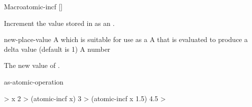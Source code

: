 \begin{functiondoc}{Macro}{atomic-incf}{ []
      \returns{} }
%

\fnsyntax \fnpurpose Increment the value stored in  as an
.

\fnpackage {}

\fnmodule {}

\fnargs
\begin{args}{new-place-value}
\arg[place] A  which is suitable for use as a
 A  that is evaluated to produce a delta value
(default is 1)
 A number
\end{args}

\fnreturns The new value of . 

\begin{alsos}{as-atomic-operation}
\end{alsos}

\fnexamples
%
\W\supp
\begin{example}
  > x
  2
  > (atomic-incf x)
  3
  > (atomic-incf x 1.5)
  4.5
  >
\end{example}

\end{functiondoc}


